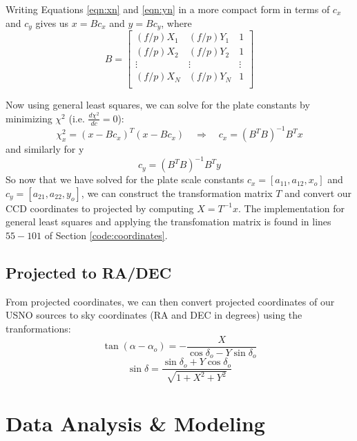 \documentclass[preprint]{aastex62}
\begin{document}
Writing Equations \ref{eqn:xn} and \ref{eqn:yn} in a more compact form in terms of $c_x$ and $c_y$ gives us $x = B c_x$ and $y = B c_y$, where
\begin{equation}
B = 
\begin{bmatrix}
    (f/p)X_1 & (f/p)Y_1 & 1 \\
    (f/p)X_2 & (f/p)Y_2 & 1 \\
    \vdots & \vdots & \vdots \\
    (f/p)X_N & (f/p)Y_N & 1 \\
\end{bmatrix} \label{eqn:Tmatrix}
\end{equation}

Now using general least squares, we can solve for the plate constants by minimizing $\chi^2$ (i.e. $\frac{d\chi^2}{dc}=0$):
\begin{equation}
    \chi^2_x = (x-B c_x)^{T}(x-B c_x) \quad \Rightarrow \quad c_x = (B^TB)^{-1}B^{T}x
\end{equation}
and similarly for y
\begin{equation}
    c_y = (B^TB)^{-1}B^{T}y
\end{equation}
So now that we have solved for the plate scale constants $c_x = [a_{11}, a_{12}, x_o]$ and $c_y = [a_{21}, a_{22}, y_o]$, we can construct the transformation matrix $T$ and convert our CCD coordinates to projected by computing $X=T^{-1}x$. The implementation for general least squares and applying the transfomation matrix is found in lines $55-101$ of Section \ref{code:coordinates}.

\subsection{Projected to RA/DEC}
From projected coordinates, we can then convert projected coordinates of our USNO sources to sky coordinates (RA and DEC in degrees) using the tranformations:
\begin{equation}
    \tan(\alpha - \alpha_o) = -\frac{X}{\cos\delta_o - Y\sin\delta_o}
\end{equation} \label{eqn:ra}
\begin{equation}
    \sin\delta = \frac{\sin\delta_o + Y\cos\delta_o}{\sqrt{1+X^2+Y^2}}
\end{equation} \label{eqn:dec}


\section{Data Analysis \& Modeling} \label{sec:analysis}
\end{document}
